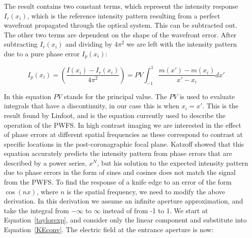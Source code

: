 The result contains two constant terms, which represent the intensity response $I_r(x_i )$, which is the reference intensity pattern resulting from a perfect wavefront propagated through the optical system. This can be subtracted out. The other two terms are dependent on the shape of the wavefront error. After subtracting  $I_r (x_i )$ and dividing by $4\pi^2$ we are left with the intensity pattern due to a pure phase error $I_p(x_i)$:


\begin{equation}
    I_p(x_i) = \left(\frac{I(x_i) - I_r(x_i)}{4\pi^2}\right)=
     PV \int_{-1}^1 \frac{m(x')-m(x_i)}{x'-x_i}dx'
\end{equation}    



In this equation $PV$ stands for the principal value. The $PV$ is used to evaluate integrals that have a discontinuity, in our case this is when $x_i=x'$.\cite{johansson1999hilbert} This is the result found by Linfoot\cite{linfoot1948theory}, and is the equation currently used to describe the operation of the PWFS.\cite{verinaud2004nature} In high contrast imaging we are interested in the effect of phase errors at different spatial frequencies as these correspond to contrast at specific locations in the post-coronagraphic focal plane. Katzoff\cite{katzoff1971quantitative} showed that this equation accurately predicts the intensity pattern from phase errors that are described by a power series, $x^{N}$, but his solution to the expected intensity pattern due to phase errors in the form of sines and cosines does not match the signal from the PWFS. To find the response of a knife edge to an error of the form $\cos(nx)$, where $n$ is the spatial frequency, we need to modify the above derivation. In this derivation we assume an infinite aperture approximation, and take the integral from $-\infty$ to $\infty$ instead of from -1 to 1. We start at Equation~\ref{taylorexp}, and consider only the linear component and substitute into Equation~\ref{KEconv}.  The electric field at the entrance aperture is now: 


